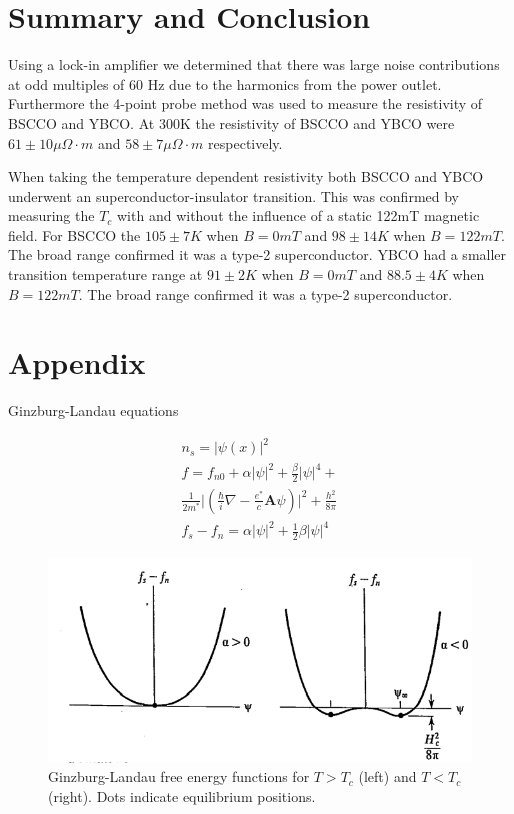 \documentclass[
reprint,
amsmath,amssymb,
aps,
tikz,
border=5pt
]{revtex4-1}
\begin{document}
 


\section*{Summary \lowercase{and} Conclusion}


    Using a lock-in amplifier we determined that there was large noise contributions at odd multiples of 60 Hz due to the harmonics from the power outlet. Furthermore the 4-point probe method was used to measure the resistivity of BSCCO and YBCO. At 300K the resistivity of BSCCO and YBCO were $61 \pm 10 \mu \Omega \cdot m$ and $58 \pm 7 \mu \Omega \cdot m$ respectively.  

    When taking the temperature dependent resistivity both BSCCO and YBCO underwent an superconductor-insulator transition. This was confirmed by measuring the $T_c$ with and without the influence of a static 122mT magnetic field. For BSCCO the $105\pm 7 K$ when $B=0 mT$ and $98\pm 14 K$ when $B=122 mT$. The broad range confirmed it was a type-2 superconductor. YBCO had a smaller transition temperature range at $91\pm 2 K$ when $B=0 mT$ and $88.5\pm 4 K$ when $B=122 mT$. The broad range confirmed it was a type-2 superconductor.


{}

\pagebreak
\newpage

\section*{Appendix}

    
 

Ginzburg-Landau equations

\begin{gather}
  n_s = |\psi(x)|^2 \\
  f = f_{n0} + \alpha |\psi|^2 + \frac{\beta}{2}|\psi|^4 + \nonumber \\ \frac{1}{2m^*} \lvert\left(\frac{\hbar}{i}\nabla - \frac{e^*}{c}\mathbf{A}\psi\right)\rvert^2 + \frac{h^2}{8\pi} \\
  f_s - f_n = \alpha |\psi|^2 + \frac{1}{2}\beta|\psi|^4
\end{gather}



\begin{figure}[h]
  \includegraphics[width=0.5 \textwidth]{figures/gl_free_E.png}
  \caption{Ginzburg-Landau free energy functions for $T>T_c$ (left) and $T<T_c$ (right). Dots indicate equilibrium positions.~\cite{tinkham}}
  \label{fig:GL_FE}
\end{figure}
\end{document}
